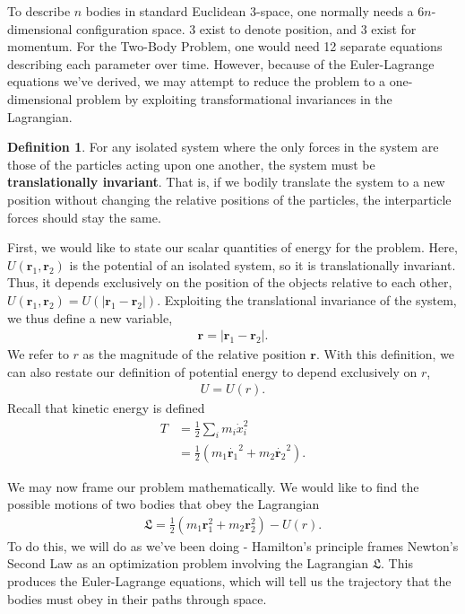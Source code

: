 \documentclass[10pt, psamsfonts]{amsart}
\theoremstyle{definition}
\newtheorem{defn}[thm]{Definition}
\theoremstyle{remark}
\numberwithin{equation}{section}
\begin{document}
To describe $n$ bodies in standard Euclidean 3-space, one normally needs a $6n$-dimensional configuration space. 3 exist to denote position, and 3 exist for momentum. For the Two-Body Problem, one would need 12 separate equations describing each parameter over time. However, because of the Euler-Lagrange equations we've derived, we may attempt to reduce the problem to a one-dimensional problem by exploiting transformational invariances in the Lagrangian.

\begin{defn}
  For any isolated system where the only forces in the system are those of the particles acting upon one another, the system must be \textbf{translationally invariant}. That is, if we bodily translate the system to a new position without changing the relative positions of the particles, the interparticle forces should stay the same.
\end{defn}

First, we would like to state our scalar quantities of energy for the problem. Here, $U(\bm{r}_1, \bm{r}_2)$ is the potential of an isolated system, so it is translationally invariant. Thus, it depends exclusively on the position of the objects relative to each other, $U(\bm{r}_1, \bm{r}_2) = U(|\bm{r}_1 - \bm{r}_2|) $. Exploiting the translational invariance of the system, we thus define a new variable,
\begin{align*}
  \bm{r} = |\bm{r}_1 - \bm{r}_2|.
\end{align*}
We refer to $r$ as the magnitude of the relative position $\bm{r}$. With this definition, we can also restate our definition of potential energy to depend exclusively on $r$,
\begin{align*}
  U = U(r).
\end{align*}
Recall that kinetic energy is defined 
\begin{align*}
  T &= \frac{1}{2} \sum_i  m_i \dot{x}_i^2 \\
    &= \frac{1}{2} (m_1 \dot{\bm{r}_1}^2 + m_2 \dot{\bm{r}_2}^2).
\end{align*}

We may now frame our problem mathematically. We would like to find the possible motions of two bodies that obey the Lagrangian
\begin{gather*}
  \mathfrak{L} = \frac{1}{2} (m_1 \bm{r}_1^2 + m_2 \bm{r}_2^2) - U(r).
\end{gather*}
To do this, we will do as we've been doing - Hamilton's principle frames Newton's Second Law as an optimization problem involving the Lagrangian $\mathfrak{L}$. This produces the Euler-Lagrange equations, which will tell us the trajectory that the bodies must obey in their paths through space.
\end{document}
